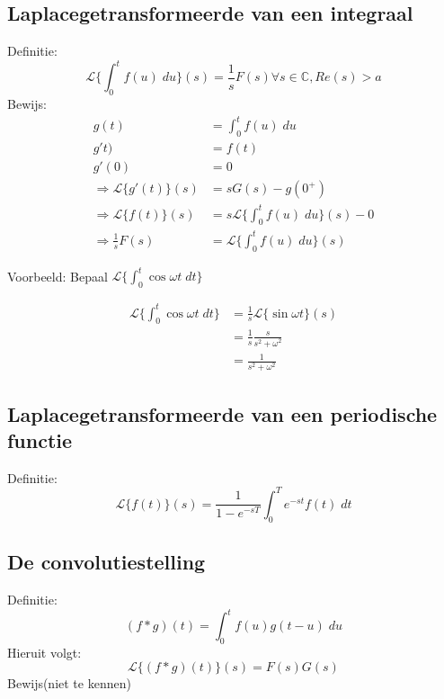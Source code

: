 \documentclass[12pt]{report}
\newcommand{\todo}[1]{
{\color{red}\textunderscore{\textit{TODO: #1}}}
}
\newcommand{\example}[2]{
    \hrulefill
    
    Voorbeeld: #1
    
    #2
    
    \hrulefill
}
\begin{document}
\subsection{Laplacegetransformeerde van een integraal}
Definitie:
$$\mathcal{L}\bigg\{\int_0^tf(u)\;du\bigg\}(s) = \frac{1}{s}F(s) \forall s \in \mathbb{C}, Re(s) > a$$
Bewijs:
\begin{equation*}
 \begin{split}
  g(t) & = \int_{0}^{t}f(u)\;du \\
  g't) & = f(t) \\
  g'(0) & = 0 \\
  \Rightarrow \mathcal{L}\{g'(t)\}(s) & = sG(s) - g(0^+) \\
  \Rightarrow \mathcal{L}\{f(t)\}(s) & = s\mathcal{L}\bigg\{\int_0^tf(u)\;du\bigg\}(s) - 0 \\
  \Rightarrow \frac{1}{s}F(s) & = \mathcal{L}\bigg\{\int_0^tf(u)\;du\bigg\}(s)
 \end{split}
\end{equation*}
\example{Bepaal $\mathcal{L}\bigg\{\int_0^t  \cos \omega t \; dt\bigg\}$}{
\begin{equation*}
 \begin{split}
  \mathcal{L}\bigg\{\int_0^t  \cos \omega t \; dt\bigg\} & = \frac{1}{s}\mathcal{L}\{\sin \omega t\}(s) \\
                                                         & = \frac{1}{s}\frac{s}{s^2 + \omega^2} \\
                                                         & = \frac{1}{s^2 + \omega^2}
 \end{split}
\end{equation*}
}
\subsection{Laplacegetransformeerde van een periodische functie}
Definitie:
$$\mathcal{L}\{f(t)\}(s) = \frac{1}{1 - e^{-sT}}\int_0^{T}e^{-st}f(t)\; dt$$
\todo{slide 19}
\subsection{De convolutiestelling}
Definitie:
$$(f * g)(t) = \int_0^t f(u)g(t - u)\;du$$
Hieruit volgt:
$$
\mathcal{L}\{(f * g)(t)\}(s) = F(s)G(s)$$
Bewijs(niet te kennen)
\end{document}
